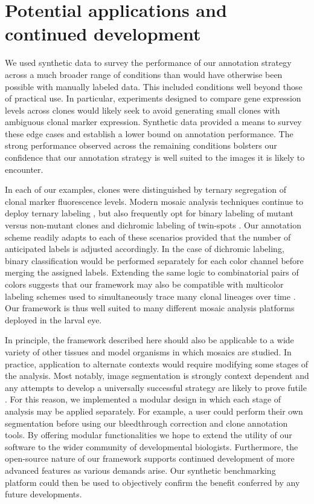 \section{Potential applications and continued development}

We used synthetic data to survey the performance of our annotation strategy across a much broader range of conditions than would have otherwise been possible with manually labeled data. This included conditions well beyond those of practical use. In particular, experiments designed to compare gene expression levels across clones would likely seek to avoid generating small clones with ambiguous clonal marker expression. Synthetic data provided a means to survey these edge cases and establish a lower bound on annotation performance. The strong performance observed across the remaining conditions bolsters our confidence that our annotation strategy is well suited to the images it is likely to encounter.

In each of our examples, clones were distinguished by ternary segregation of clonal marker fluorescence levels. Modern mosaic analysis techniques continue to deploy ternary labeling \cite{Gambis2011,Dourlen2013}, but also frequently opt for binary labeling of mutant versus non-mutant clones \cite{Fisher2017,Wu2007,Zhou2016} and dichromic labeling of twin-spots \cite{Heffern2009,Yu2010}. Our annotation scheme readily adapts to each of these scenarios provided that the number of anticipated labels is adjusted accordingly. In the case of dichromic labeling, binary classification would be performed separately for each color channel before merging the assigned labels. Extending the same logic to combinatorial pairs of colors suggests that our framework may also be compatible with multicolor labeling schemes used to simultaneously trace many clonal lineages over time \cite{Denes2013,Hadjieconomou2011,Hampel2011}. Our framework is thus well suited to many different mosaic analysis platforms deployed in the larval eye.

In principle, the framework described here should also be applicable to a wide variety of other tissues \cite{Neufeld1998,Tworoger1999} and model organisms \cite{Collins2010,Munoz-Jimenez2017,Wang2007} in which mosaics are studied. In practice, application to alternate contexts would require modifying some stages of the analysis. Most notably, image segmentation is strongly context dependent and any attempts to develop a universally successful strategy are likely to prove futile \cite{Meijering2012}. For this reason, we implemented a modular design in which each stage of analysis may be applied separately. For example, a user could perform their own segmentation before using our bleedthrough correction and clone annotation tools. By offering modular functionalities we hope to extend the utility of our software to the wider community of developmental biologists. Furthermore, the open-source nature of our framework supports continued development of more advanced features as various demands arise. Our synthetic benchmarking platform could then be used to objectively confirm the benefit conferred by any future developments.
